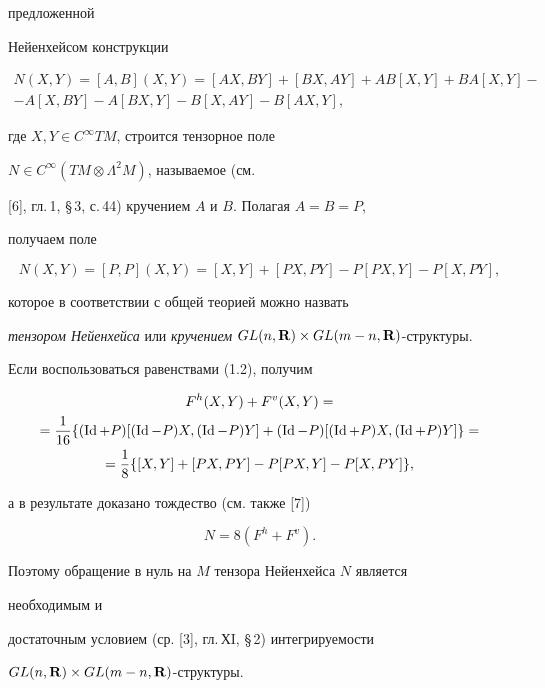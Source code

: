 предложенной 


Нейенхейсом конструкции 


\begin{multline*} 


N(X,Y)=[A,B](X,Y)=[AX,BY]+[BX,AY]+AB[X,Y]+BA[X,Y]-\\ 


-A[X,BY]-A[BX,Y]-B[X,AY]-B[AX,Y],


\end{multline*} 


где $X,Y\in C^\infty TM$, строится тензорное поле 


$N\in C^\infty(TM\otimes\Lambda^2M)$, называемое (см. 


[6], гл.\,1, \S\,3, с.\,44) кручением $A$ и $B$. Полагая $A=B=P$, 


получаем поле 


$$ 


N(X,Y)=[P,P](X,Y)=[X,Y]+[PX,PY]-P[PX,Y]-P[X,PY], 


$$ 


которое в соответствии с общей теорией можно назвать


{\it тензором Нейенхейса} или {\it кручением} $GL(n,\bold R)\times GL(m-n,\bold R)$-структуры. 


Если воспользоваться равенствами (1.2), получим 


\begin{gather*} 


F^h(X,Y)+F^v(X,Y)=\\ 


=\frac{1}{16}\{(\Id+P)[(\Id-P)X,(\Id-P)Y]+(\Id-P) 


[(\Id+P)X,(\Id+P)Y]\}= \\ 


=\frac{1}{8}\{[X,Y]+[PX,PY]-P[PX,Y]-P[X,PY]\}, 


\end{gather*} 


а в результате доказано тождество (см. также [7]) 


$$ 


N=8(F^h+F^v). 


$$ 


Поэтому обращение в нуль на $M$ тензора Нейенхейса $N$ является 


необходимым и 


достаточным условием (ср. [3], гл.\,ХI, \S\,2) интегрируемости 


$GL(n,\bold R)\times GL(m-n,\bold R)$-структуры. 


 


